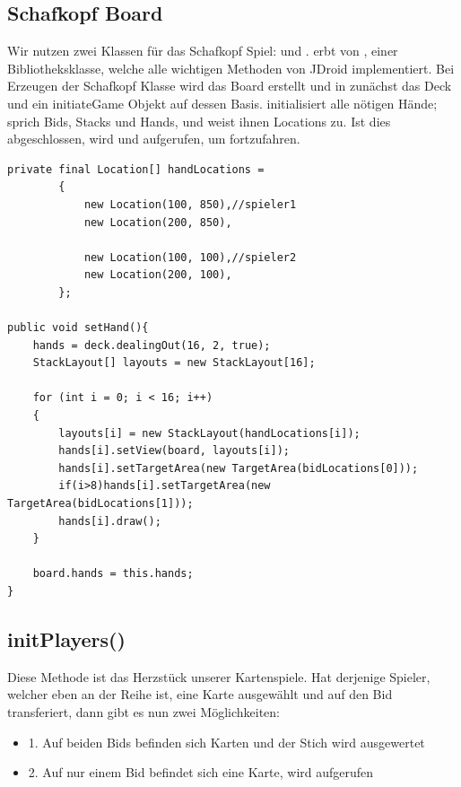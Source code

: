 \subsection{Schafkopf Board}

Wir nutzen zwei Klassen für das Schafkopf Spiel:  und
.  erbt von , einer
Bibliotheksklasse, welche alle wichtigen Methoden von JDroid implementiert. Bei
Erzeugen der Schafkopf Klasse wird das Board erstellt und in 
zunächst das Deck und ein initiateGame Objekt auf dessen Basis.
 initialisiert alle nötigen Hände; sprich Bids, Stacks und
Hands, und weist ihnen Locations zu. Ist dies abgeschlossen, wird
 und  aufgerufen, um fortzufahren.

\begin{lstlisting}[caption={Beispiel Hands initialisieren},captionpos=b]
private final Location[] handLocations =
        {
            new Location(100, 850),//spieler1
            new Location(200, 850),

            new Location(100, 100),//spieler2
            new Location(200, 100),
        };

public void setHand(){
    hands = deck.dealingOut(16, 2, true);
    StackLayout[] layouts = new StackLayout[16];

    for (int i = 0; i < 16; i++)
    {
        layouts[i] = new StackLayout(handLocations[i]);
        hands[i].setView(board, layouts[i]);
        hands[i].setTargetArea(new TargetArea(bidLocations[0]));
        if(i>8)hands[i].setTargetArea(new TargetArea(bidLocations[1]));
        hands[i].draw();
    }

    board.hands = this.hands;
}

\end{lstlisting}

\subsection{initPlayers()}

Diese Methode ist das Herzstück unserer Kartenspiele. Hat derjenige Spieler,
welcher eben an der Reihe ist, eine Karte ausgewählt und auf den Bid
transferiert, dann gibt es nun zwei Möglichkeiten:

\begin{itemize}
	\item 1. Auf beiden Bids befinden sich Karten und der Stich wird ausgewertet
	\item 2. Auf nur einem Bid befindet sich eine Karte,  wird 		 aufgerufen
\end{itemize}

